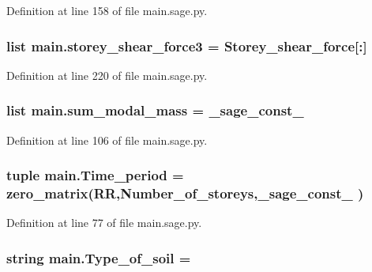 Definition at line 158 of file main.\+sage.\+py.

\hypertarget{namespacemain_aa741e0bac28acc57bb99fbe2b14205c7}{}
\subsubsection[{storey\+\_\+shear\+\_\+force3}]{\setlength{\rightskip}{0pt plus 5cm}list main.\+storey\+\_\+shear\+\_\+force3 = {\bf Storey\+\_\+shear\+\_\+force}\mbox{[}\+:\mbox{]}}\label{namespacemain_aa741e0bac28acc57bb99fbe2b14205c7}


Definition at line 220 of file main.\+sage.\+py.

\hypertarget{namespacemain_a27fb93072b84fd448623807df350f132}{}
\subsubsection[{sum\+\_\+modal\+\_\+mass}]{\setlength{\rightskip}{0pt plus 5cm}list main.\+sum\+\_\+modal\+\_\+mass = \+\_\+sage\+\_\+const\+\_}\label{namespacemain_a27fb93072b84fd448623807df350f132}


Definition at line 106 of file main.\+sage.\+py.

\hypertarget{namespacemain_a6bf4b8266bcb3b4f390149620fea3d6c}{}
\subsubsection[{Time\+\_\+period}]{\setlength{\rightskip}{0pt plus 5cm}tuple main.\+Time\+\_\+period = zero\+\_\+matrix(R\+R,Number\+\_\+of\+\_\+storeys,\+\_\+sage\+\_\+const\+\_ )}\label{namespacemain_a6bf4b8266bcb3b4f390149620fea3d6c}


Definition at line 77 of file main.\+sage.\+py.

\hypertarget{namespacemain_a52e65712caa18dade1326ad4efeebfa1}{}
\subsubsection[{Type\+\_\+of\+\_\+soil}]{\setlength{\rightskip}{0pt plus 5cm}string main.\+Type\+\_\+of\+\_\+soil = \textquotesingle{}\textquotesingle{}}\label{namespacemain_a52e65712caa18dade1326ad4efeebfa1}



